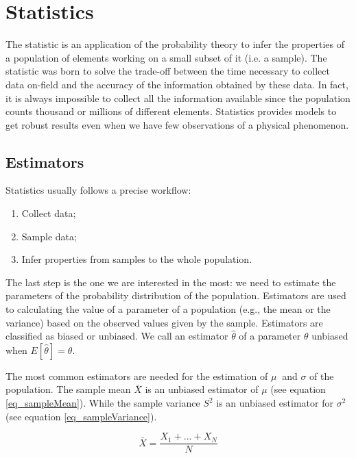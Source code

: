 \section{Statistics} \label{secStatistics}

The statistic is an application of the probability theory to infer the properties of a population of elements working on a small subset of it (i.e. a sample). The statistic was born to solve the trade-off between the time necessary to collect data on-field and the accuracy of the information obtained by these data. In fact, it is always impossible to collect all the information available since the population counts thousand or millions of different elements. Statistics provides models to get robust results even when we have few observations of a physical phenomenon.

\subsection{Estimators} \label{secEstimators}

Statistics usually follows a precise workflow:
\begin{enumerate}
    \item Collect data; 
    \item Sample data;
    \item Infer properties from samples to the whole population.
\end{enumerate}

The last step is the one we are interested in the most: we need to estimate the parameters of the probability distribution of the population. Estimators are used to calculating the value of a parameter of a population (e.g., the mean or the variance) based on the observed values given by the sample. Estimators are classified as biased or unbiased. We call an estimator $\hat{\theta}$ of a parameter $\theta$ unbiased when $E\left[\hat{\theta}\right]=\theta$.\par

The most common estimators are needed for the estimation of $\mu\ $ and $\sigma $ of the population. The sample mean $\bar{X}$ is an unbiased estimator of $\mu$ (see equation \ref{eq_sampleMean}). While the sample variance $S^2$ is an unbiased estimator for $\sigma^2$ (see equation \ref{eq_sampleVariance}).

\begin{equation}
\bar{X}=\frac{X_1+\ldots+X_N}{N}
\label{eq_sampleMean}
\end{equation}

